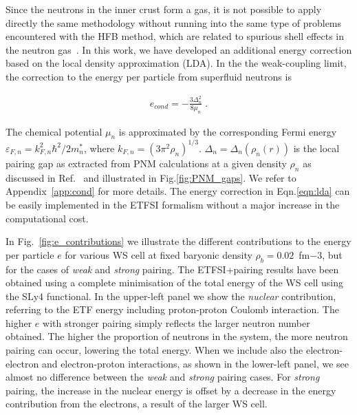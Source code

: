\documentclass[
    amsmath,amssymb,
    aps,
    prc,
    floatfix,
]{revtex4-2}
\begin{document}
Since the neutrons in the inner crust form a gas, it is not possible to apply directly the same methodology without running into the same type of problems encountered with the HFB method, which are related to spurious shell effects in the neutron gas~\cite{Margueron2007b}.
In this work, we have developed an additional energy correction based on the local density approximation (LDA). In the the weak-coupling limit, the correction to the energy per particle from superfluid neutrons is~\cite{PhysRevLett793347}

    \begin{eqnarray}\label{eqn:lda}
        e_{cond}=-\frac{3\Delta_n^2}{8\mu_n}\;.
    \end{eqnarray}

\noindent The chemical potential $\mu_n$ is approximated by the corresponding Fermi energy $\varepsilon_{F,n}=k_{F,n}^2\hbar^2/2m^*_n$, where $k_{F,n}=\left(3\pi^2\rho_n\right)^{1/3}$. $\Delta_n=\Delta_n(\rho_n(r))$ is the local pairing gap as extracted from PNM calculations at a given density $\rho_n$ as discussed in Ref.~\cite{pastore2008microscopic} and illustrated in Fig.\ref{fig:PNM_gaps}.
We refer to Appendix~\ref{app:cond} for more details. The energy correction in Eqn.\ref{eqn:lda} can be easily implemented in the ETFSI formalism without a major increase in the computational cost.

In Fig.~\ref{fig:e_contributions} we illustrate the different contributions to the energy per particle $e$ for various WS cell at fixed baryonic density $\rho_b=0.02$~fm${-3}$, but for the cases of \emph{weak} and \emph{strong} pairing. The ETFSI+pairing results have been obtained using a complete minimisation of the total energy of the WS cell using the SLy4 functional.
In the upper-left panel we show the \emph{nuclear} contribution, referring to the ETF energy including proton-proton Coulomb interaction. The higher $e$ with stronger pairing simply reflects the larger neutron number obtained. The higher the proportion of neutrons in the system, the more neutron pairing can occur, lowering the total energy. When we include also the electron-electron and electron-proton interactions, as shown in the lower-left panel, we see almost no difference between the \emph{weak} and \emph{strong} pairing cases. For \emph{strong} pairing, the increase in the nuclear energy is offset by a decrease in the energy contribution from the electrons, a result of the larger WS cell.
\end{document}
